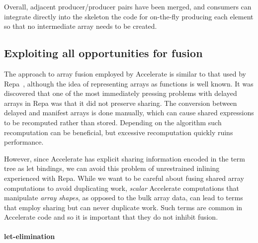 Overall, adjacent producer/producer pairs have been merged, and consumers can
integrate directly into the skeleton the code for on-the-fly producing each
element so that no intermediate array needs to be created.


\subsection{Exploiting all opportunities for fusion}
\label{sec:binder_elimination}

The approach to array fusion employed by Accelerate is similar to that used by
Repa~\cite{Keller:2010er,Lippmeier:2011cd,Lippmeier:2012gx}, although the idea
of representing arrays as functions is well known. It was discovered that one of
the most immediately pressing problems with delayed arrays in Repa was that it
did not preserve sharing. The conversion between delayed and manifest arrays is
done manually, which can cause shared expressions to be recomputed rather than
stored. Depending on the algorithm such recomputation can be beneficial, but
excessive recomputation quickly ruins performance.

However, since Accelerate has explicit sharing information encoded in the term
tree as let bindings, we can avoid this problem of unrestrained inlining
experienced with Repa. While we want to be careful about fusing shared array
computations to avoid duplicating work, \emph{scalar} Accelerate computations
that manipulate \emph{array shapes}, as opposed to the bulk array data, can lead
to terms that employ sharing but can never duplicate work. Such terms are common
in Accelerate code and so it is important that they do not inhibit fusion.


\paragraph{let-elimination}

